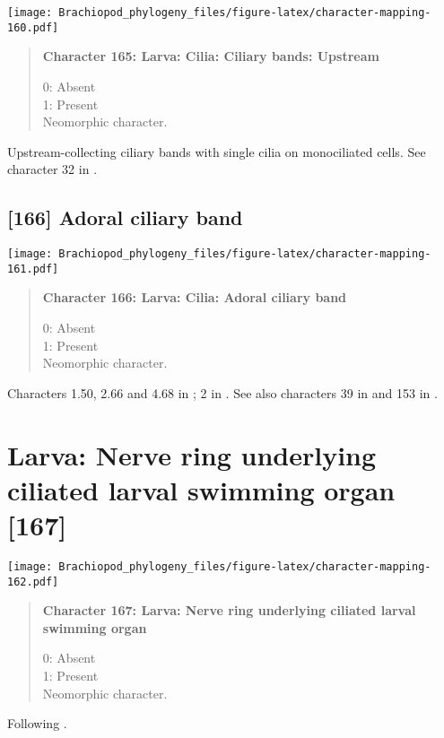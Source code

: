 \documentclass[openany]{book}
\theoremstyle{definition}
\theoremstyle{definition}
\theoremstyle{definition}
\theoremstyle{remark}
\begin{document}
\texttt{[image: Brachiopod\_phylogeny\_files/figure-latex/character-mapping-160.pdf]}

\begin{quote}
\textbf{Character 165: Larva: Cilia: Ciliary bands: Upstream}

0: Absent\\
1: Present\\
Neomorphic character.
\end{quote}

Upstream-collecting ciliary bands with single cilia on monociliated
cells. See character 32 in \citet{Glenner2004}.

\subsection*{{[}166{]} Adoral ciliary band}\label{adoral-ciliary-band}

\texttt{[image: Brachiopod\_phylogeny\_files/figure-latex/character-mapping-161.pdf]}

\begin{quote}
\textbf{Character 166: Larva: Cilia: Adoral ciliary band}

0: Absent\\
1: Present\\
Neomorphic character.
\end{quote}

Characters 1.50, 2.66 and 4.68 in \citet{SPS1996}; 2 in
\citet{Vinther2008}. See also characters 39 in \citet{Haszprunar1996}
and 153 in \citet{Giribet2002}.

\section{Larva: Nerve ring underlying ciliated larval swimming organ
{[}167{]}}\label{larva-nerve-ring-underlying-ciliated-larval-swimming-organ-167}

\texttt{[image: Brachiopod\_phylogeny\_files/figure-latex/character-mapping-162.pdf]}

\begin{quote}
\textbf{Character 167: Larva: Nerve ring underlying ciliated larval
swimming organ}

0: Absent\\
1: Present\\
Neomorphic character.
\end{quote}

Following \citet{Wanninger2009}.
\end{document}
